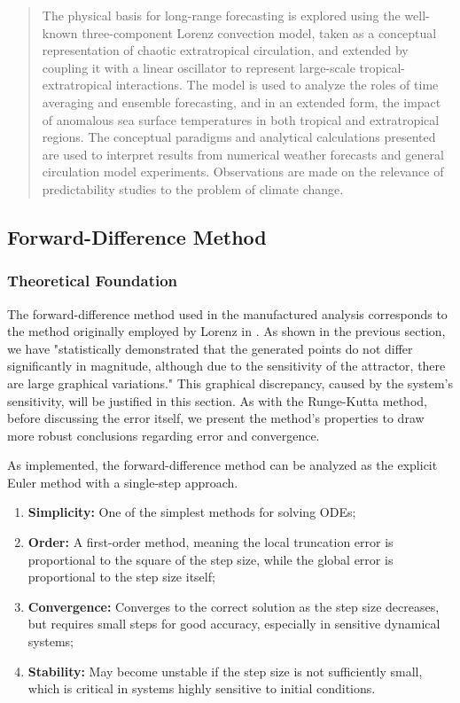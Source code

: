 \documentclass[12pt, a4paper]{article}
\begin{document}
	\begin{quote}
		\fontsize{10}{12}\selectfont
		The physical basis for long-range forecasting is explored using the well-known three-component Lorenz convection model, taken as a conceptual representation of chaotic extratropical circulation, and extended by coupling it with a linear oscillator to represent large-scale tropical-extratropical interactions. The model is used to analyze the roles of time averaging and ensemble forecasting, and in an extended form, the impact of anomalous sea surface temperatures in both tropical and extratropical regions. The conceptual paradigms and analytical calculations presented are used to interpret results from numerical weather forecasts and general circulation model experiments. Observations are made on the relevance of predictability studies to the problem of climate change.
	\end{quote}
	
	    
	    
	\subsection{Forward-Difference Method}
	\subsubsection{Theoretical Foundation}
	
	The forward-difference method used in the manufactured analysis corresponds to the method originally employed by Lorenz in \cite{Lorenz1963}. As shown in the previous section, we have "statistically demonstrated that the generated points do not differ significantly in magnitude, although due to the sensitivity of the attractor, there are large graphical variations." This graphical discrepancy, caused by the system's sensitivity, will be justified in this section. As with the Runge-Kutta method, before discussing the error itself, we present the method's properties to draw more robust conclusions regarding error and convergence.
	
	As implemented, the forward-difference method can be analyzed as the explicit Euler method with a single-step approach.
	
	\begin{enumerate}
		\item \textbf{Simplicity:} One of the simplest methods for solving ODEs;
		\item \textbf{Order:} A first-order method, meaning the local truncation error is proportional to the square of the step size, while the global error is proportional to the step size itself;
		\item \textbf{Convergence:} Converges to the correct solution as the step size decreases, but requires small steps for good accuracy, especially in sensitive dynamical systems;
		\item \textbf{Stability:} May become unstable if the step size is not sufficiently small, which is critical in systems highly sensitive to initial conditions.
	\end{enumerate}
	
\end{document}
